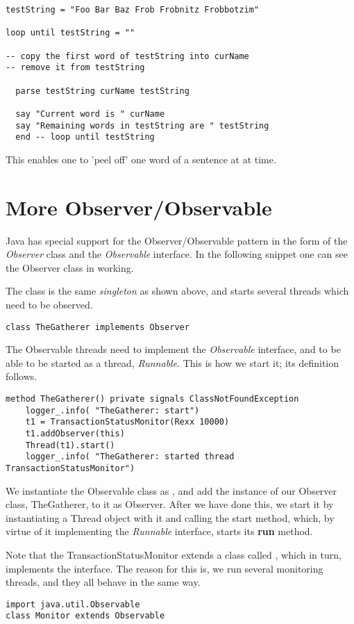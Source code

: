 {\begin{lstlisting}
testString = "Foo Bar Baz Frob Frobnitz Frobbotzim"

loop until testString = ""

-- copy the first word of testString into curName
-- remove it from testString

  parse testString curName testString

  say "Current word is " curName
  say "Remaining words in testString are " testString
  end -- loop until testString
\end{lstlisting}
This enables one to 'peel off' one word of a sentence at at time.


\section{More Observer/Observable}

Java has special support for the Observer/Observable pattern in the
form of the \emph{Observer} class and the \emph{Observable} interface.
In the following snippet one can see the Observer class in working.

The class is the same \emph{singleton} as shown above, and starts several threads which need
to be observed.
\begin{lstlisting}[label=obs,caption=Observer]
class TheGatherer implements Observer 
\end{lstlisting}

The Observable threads need to implement the \emph{Observable}
interface, and to be able to be started as a thread, \emph{Runnable}.
This is how we start it; its definition follows.

\begin{lstlisting}[label=obs2,caption=Observable: starting Observable Threads]
  method TheGatherer() private signals ClassNotFoundException
    logger_.info( "TheGatherer: start")
    t1 = TransactionStatusMonitor(Rexx 10000)
    t1.addObserver(this)
    Thread(t1).start()
    logger_.info( "TheGatherer: started thread TransactionStatusMonitor")
\end{lstlisting}

We instantiate the Observable class  as , and add the instance of
our Observer class, TheGatherer, to it as Observer. After we have done
this, we start it by instantiating a Thread object with it and calling
the start method, which, by virtue of it implementing the
\emph{Runnable} interface, starts its \textbf{run} method.

Note that the TransactionStatusMonitor extends a class called
, which in turn, implements the 
interface. The reason for this is, we run several monitoring threads,
and they all behave in the same way.
\begin{lstlisting}[label=obs4,caption=The Monitor Superclass]
import java.util.Observable
class Monitor extends Observable


\end{lstlisting}}
